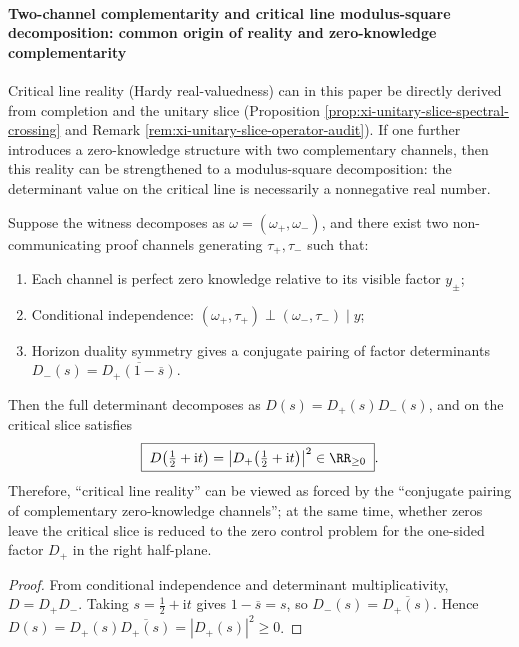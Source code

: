 \paragraph{Two-channel complementarity and critical line modulus-square decomposition: common origin of reality and zero-knowledge complementarity}
Critical line reality (Hardy real-valuedness) can in this paper be directly derived from completion and the unitary slice (Proposition \ref{prop:xi-unitary-slice-spectral-crossing} and Remark \ref{rem:xi-unitary-slice-operator-audit}).
If one further introduces a zero-knowledge structure with two complementary channels, then this reality can be strengthened to a modulus-square decomposition: the determinant value on the critical line is necessarily a nonnegative real number.

\begin{proposition}\label{prop:xi-hzom-two-channel-modsquare}
Suppose the witness decomposes as \(\omega=(\omega_{+},\omega_{-})\), and there exist two non-communicating proof channels generating \(\tau_{+},\tau_{-}\) such that:
\begin{enumerate}
  \item Each channel is perfect zero knowledge relative to its visible factor \(y_{\pm}\);
  \item Conditional independence: \((\omega_{+},\tau_{+})\perp(\omega_{-},\tau_{-})\mid y\);
  \item Horizon duality symmetry gives a conjugate pairing of factor determinants
  \(
  D_{-}(s)=\overline{D_{+}(1-\overline{s})}.
  \)
\end{enumerate}
Then the full determinant decomposes as \(D(s)=D_{+}(s)D_{-}(s)\), and on the critical slice satisfies
\[
\boxed{\;
D\!\left(\tfrac12+\mathrm{i}t\right)=\left|D_{+}\!\left(\tfrac12+\mathrm{i}t\right)\right|^{2}\in\RR_{\ge 0}\; }.
\]
Therefore, ``critical line reality'' can be viewed as forced by the ``conjugate pairing of complementary zero-knowledge channels''; at the same time, whether zeros leave the critical slice is reduced to the zero control problem for the one-sided factor \(D_{+}\) in the right half-plane.
\end{proposition}

\begin{proof}
From conditional independence and determinant multiplicativity, \(D=D_{+}D_{-}\).
Taking \(s=\tfrac12+\mathrm{i}t\) gives \(1-\overline{s}=s\), so
\(
D_{-}(s)=\overline{D_{+}(s)}
\).
Hence \(D(s)=D_{+}(s)\overline{D_{+}(s)}=|D_{+}(s)|^{2}\ge 0\). \qedhere
\end{proof}

